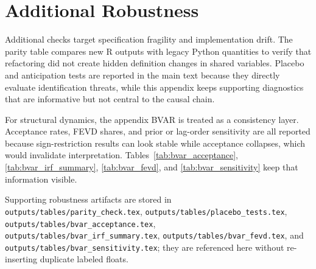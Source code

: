 \section{Additional Robustness}

Additional checks target specification fragility and implementation drift. The parity table compares new R outputs with legacy Python quantities to verify that refactoring did not create hidden definition changes in shared variables. Placebo and anticipation tests are reported in the main text because they directly evaluate identification threats, while this appendix keeps supporting diagnostics that are informative but not central to the causal chain.

For structural dynamics, the appendix BVAR is treated as a consistency layer. Acceptance rates, FEVD shares, and prior or lag-order sensitivity are all reported because sign-restriction results can look stable while acceptance collapses, which would invalidate interpretation. Tables~\ref{tab:bvar_acceptance}, \ref{tab:bvar_irf_summary}, \ref{tab:bvar_fevd}, and \ref{tab:bvar_sensitivity} keep that information visible.

Supporting robustness artifacts are stored in \texttt{outputs/tables/parity\_check.tex}, \texttt{outputs/tables/placebo\_tests.tex}, \texttt{outputs/tables/bvar\_acceptance.tex}, \texttt{outputs/tables/bvar\_irf\_summary.tex}, \texttt{outputs/tables/bvar\_fevd.tex}, and \texttt{outputs/tables/bvar\_sensitivity.tex}; they are referenced here without re-inserting duplicate labeled floats.
